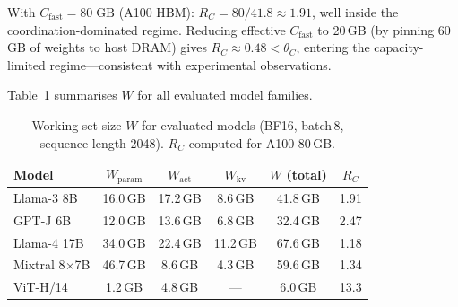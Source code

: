 With $C_{\mathrm{fast}} = 80\;\text{GB}$ (A100 HBM):
$R_C = 80/41.8 \approx 1.91$, well inside the coordination-dominated regime.
Reducing effective $C_{\mathrm{fast}}$ to 20\,GB (by pinning 60\,GB of weights
to host DRAM) gives $R_C \approx 0.48 < \theta_C$, entering the
capacity-limited regime---consistent with experimental observations.

Table~\ref{tab:W_models} summarises $W$ for all evaluated model families.

\begin{table}[h]
\centering
\caption{Working-set size $W$ for evaluated models (BF16, batch\,8,
sequence length 2048). $R_C$ computed for A100 80\,GB.}
\label{tab:W_models}
\renewcommand{\arraystretch}{1.15}
\begin{tabular}{lccccc}
\toprule
\textbf{Model} & $W_{\mathrm{param}}$ & $W_{\mathrm{act}}$ & $W_{\mathrm{kv}}$ &
$W$ (total) & $R_C$ \\
\midrule
Llama-3 8B          & 16.0\,GB & 17.2\,GB & 8.6\,GB  & 41.8\,GB & 1.91 \\
GPT-J 6B            & 12.0\,GB & 13.6\,GB & 6.8\,GB  & 32.4\,GB & 2.47 \\
Llama-4 17B         & 34.0\,GB & 22.4\,GB & 11.2\,GB & 67.6\,GB & 1.18 \\
Mixtral 8$\times$7B & 46.7\,GB &  8.6\,GB &  4.3\,GB & 59.6\,GB & 1.34 \\
ViT-H/14            &  1.2\,GB &  4.8\,GB & —        &  6.0\,GB & 13.3 \\
\bottomrule
\end{tabular}
\end{table}
